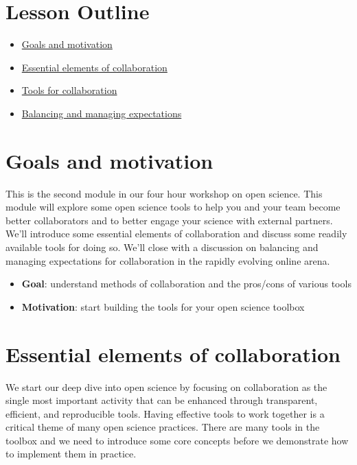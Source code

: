 \documentclass[
  letterpaper,
  DIV=11,
  numbers=noendperiod]{scrreprt}
\providecommand{\tightlist}{%
  \setlength{\itemsep}{0pt}\setlength{\parskip}{0pt}}\usepackage{longtable,booktabs,array}
\begin{document}
\hypertarget{lesson-outline-1}{%
\section{Lesson Outline}\label{lesson-outline-1}}

\begin{itemize}
\tightlist
\item
  \protect\hyperlink{goals-and-motivation-3}{Goals and motivation}
\item
  \protect\hyperlink{essential-elements-of-collaboration}{Essential
  elements of collaboration}
\item
  \protect\hyperlink{tools-for-collaboration}{Tools for collaboration}
\item
  \protect\hyperlink{balancing-and-managing-expectations}{Balancing and
  managing expectations}
\end{itemize}

\hypertarget{goals-and-motivation-1}{%
\section{Goals and motivation}\label{goals-and-motivation-1}}

This is the second module in our four hour workshop on open science.
This module will explore some open science tools to help you and your
team become better collaborators and to better engage your science with
external partners. We'll introduce some essential elements of
collaboration and discuss some readily available tools for doing so.
We'll close with a discussion on balancing and managing expectations for
collaboration in the rapidly evolving online arena.

\begin{itemize}
\tightlist
\item
  \textbf{Goal}: understand methods of collaboration and the pros/cons
  of various tools
\item
  \textbf{Motivation}: start building the tools for your open science
  toolbox
\end{itemize}

\hypertarget{essential-elements-of-collaboration}{%
\section{Essential elements of
collaboration}\label{essential-elements-of-collaboration}}

We start our deep dive into open science by focusing on collaboration as
the single most important activity that can be enhanced through
transparent, efficient, and reproducible tools. Having effective tools
to work together is a critical theme of many open science practices.
There are many tools in the toolbox and we need to introduce some core
concepts before we demonstrate how to implement them in practice.
\end{document}
